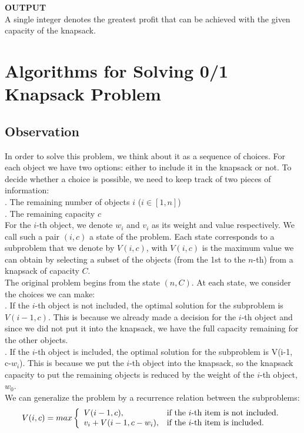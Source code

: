 \documentclass{article}
\begin{document}
\textbf{OUTPUT}\\
A single integer denotes the greatest profit that can be achieved with the given capacity of the knapsack.
\section{Algorithms for Solving 0/1 Knapsack Problem}
\subsection{Observation}
\indent In order to solve this problem, we think about it as a sequence of choices. For each object we have two options: either to include it in the knapsack or not. To decide whether a choice is possible, we need to keep track of two pieces of information: \\
. The remaining number of objects $i$ ($i \in [1, n]$)\\
. The remaining capacity $c$ \\
\indent For the $i$-th object, we denote $w_i$ and $v_i$ as its weight and value respectively. We call such a pair $(i,c)$ a state of the problem. Each state corresponds to a subproblem that we denote by $V(i,c)$, with $V(i,c)$ is the maximum value we can obtain by selecting a subset of the objects (from the 1st to the $n$-th) from a knapsack of  capacity $C$. \\
\indent The original problem begins from the state $(n,C)$. At each state, we consider the choices we can make: \\
. If the $i$-th object is not included, the optimal solution for the subproblem is $V(i-1, c)$. This is because we already made a decision for the $i$-th object and since we did not put it into the knapsack, we have the full capacity remaining for the other objects. \\
. If the $i$-th object is included, the optimal solution for the subproblem is V(i-1, c-$w_i$). This is because we put the $i$-th object into the knapsack, so the knapsack capacity to put the remaining objects is reduced by the weight of the $i$-th object, $w_0$. \\
\indent We can generalize the problem by a recurrence relation between the subproblems:
\begin{equation}
    \centering
        V(i, c)= max\left\{
            \begin{array}{ll}
            V(i-1, c), & \mbox{if the $i$-th item is not included}.\\
            v_i + V(i-1, c-w_i), & \mbox{if the $i$-th item is included}.
            \end{array}
        \right.
\end{equation}
\end{document}
